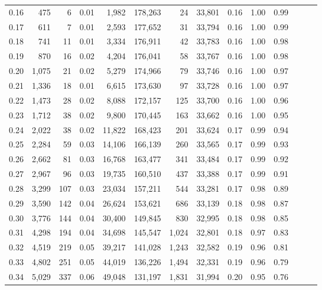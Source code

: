 \begin{tabular}{rrrrrrrrrrrrrr}
0.16 &    475 &      6 &  0.01 &    1,982 &  178,263 &      24 &  33,801 &  0.16 &  1.00 &      0.99 \\
0.17 &    611 &      7 &  0.01 &    2,593 &  177,652 &      31 &  33,794 &  0.16 &  1.00 &      0.99 \\
0.18 &    741 &     11 &  0.01 &    3,334 &  176,911 &      42 &  33,783 &  0.16 &  1.00 &      0.98 \\
0.19 &    870 &     16 &  0.02 &    4,204 &  176,041 &      58 &  33,767 &  0.16 &  1.00 &      0.98 \\
0.20 &  1,075 &     21 &  0.02 &    5,279 &  174,966 &      79 &  33,746 &  0.16 &  1.00 &      0.97 \\
0.21 &  1,336 &     18 &  0.01 &    6,615 &  173,630 &      97 &  33,728 &  0.16 &  1.00 &      0.97 \\
0.22 &  1,473 &     28 &  0.02 &    8,088 &  172,157 &     125 &  33,700 &  0.16 &  1.00 &      0.96 \\
0.23 &  1,712 &     38 &  0.02 &    9,800 &  170,445 &     163 &  33,662 &  0.16 &  1.00 &      0.95 \\
0.24 &  2,022 &     38 &  0.02 &   11,822 &  168,423 &     201 &  33,624 &  0.17 &  0.99 &      0.94 \\
0.25 &  2,284 &     59 &  0.03 &   14,106 &  166,139 &     260 &  33,565 &  0.17 &  0.99 &      0.93 \\
0.26 &  2,662 &     81 &  0.03 &   16,768 &  163,477 &     341 &  33,484 &  0.17 &  0.99 &      0.92 \\
0.27 &  2,967 &     96 &  0.03 &   19,735 &  160,510 &     437 &  33,388 &  0.17 &  0.99 &      0.91 \\
0.28 &  3,299 &    107 &  0.03 &   23,034 &  157,211 &     544 &  33,281 &  0.17 &  0.98 &      0.89 \\
0.29 &  3,590 &    142 &  0.04 &   26,624 &  153,621 &     686 &  33,139 &  0.18 &  0.98 &      0.87 \\
0.30 &  3,776 &    144 &  0.04 &   30,400 &  149,845 &     830 &  32,995 &  0.18 &  0.98 &      0.85 \\
0.31 &  4,298 &    194 &  0.04 &   34,698 &  145,547 &   1,024 &  32,801 &  0.18 &  0.97 &      0.83 \\
0.32 &  4,519 &    219 &  0.05 &   39,217 &  141,028 &   1,243 &  32,582 &  0.19 &  0.96 &      0.81 \\
0.33 &  4,802 &    251 &  0.05 &   44,019 &  136,226 &   1,494 &  32,331 &  0.19 &  0.96 &      0.79 \\
0.34 &  5,029 &    337 &  0.06 &   49,048 &  131,197 &   1,831 &  31,994 &  0.20 &  0.95 &      0.76 \\

\end{tabular}
